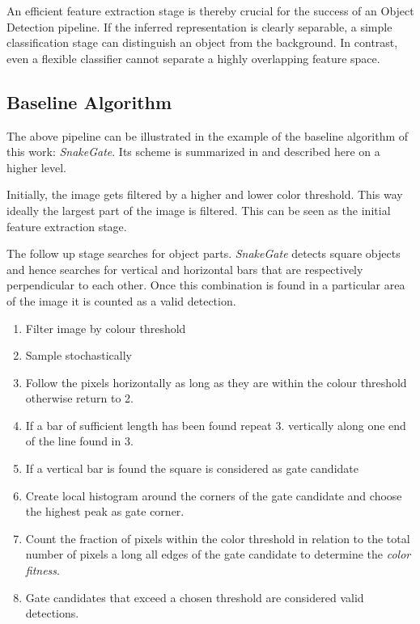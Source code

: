 An efficient feature extraction stage is thereby crucial for the success of an Object Detection pipeline. If the inferred representation is clearly separable, a simple classification stage can distinguish an object from the background. In contrast, even a flexible classifier cannot separate a highly overlapping feature space.



\subsection{Baseline Algorithm}

The above pipeline can be illustrated in the example of the baseline algorithm of this work: \textit{SnakeGate}. Its scheme is summarized in  and described here on a higher level.

Initially, the image gets filtered by a higher and lower color threshold. This way ideally the largest part of the image is filtered. This can be seen as the initial feature extraction stage.

The follow up stage searches for object parts. \textit{SnakeGate} detects square objects and hence searches for vertical and horizontal bars that are respectively perpendicular to each other. Once this combination is found in a particular area of the image it is counted as a valid detection. 

\begin{enumerate}
	\item Filter image by colour threshold
	\item Sample stochastically 
	\item Follow the pixels horizontally as long as they are within the colour threshold otherwise return to 2.
	\item If a bar of sufficient length has been found repeat 3. vertically along one end of the line found in 3.
	\item If a vertical bar is found the square is considered as gate candidate
	\item Create local histogram around the corners of the gate candidate and choose the highest peak as gate corner.
	\item Count the fraction of pixels within the color threshold  in relation to the total number of pixels a long all edges of the gate candidate to determine the \textit{color fitness}.
	\item Gate candidates that exceed a chosen threshold are considered valid detections.
\end{enumerate}

